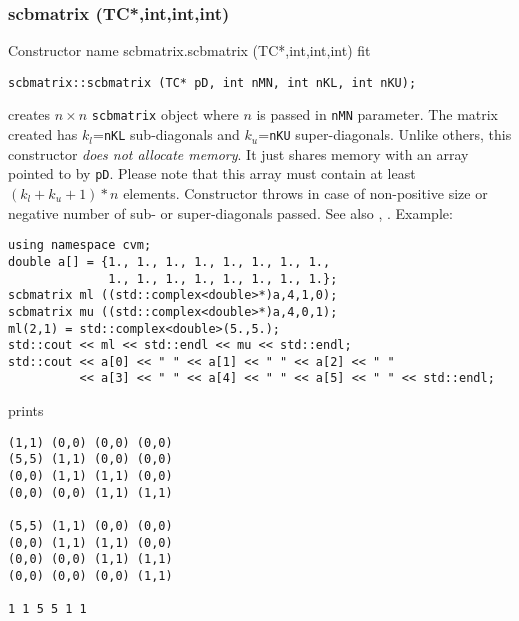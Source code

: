 \subsubsection{scbmatrix (TC*,int,int,int)}
Constructor%
\pdfdest name {scbmatrix.scbmatrix (TC*,int,int,int)} fit
\begin{verbatim}
scbmatrix::scbmatrix (TC* pD, int nMN, int nKL, int nKU);
\end{verbatim}
creates  $n\times n$ \verb"scbmatrix" object where $n$ is passed in
\verb"nMN" parameter. The matrix created has $k_l$=\verb"nKL" 
sub-diagonals and $k_u$=\verb"nKU" super-diagonals.
Unlike others, this constructor \textit{does not allocate  memory}.
It just shares  memory with an array pointed to by \verb"pD".
Please note that this array must contain at least $(k_l + k_u + 1)*n$ elements.
Constructor throws  
in case of non-positive size or negative number of sub- or super-diagonals 
passed.
See also ,
.
Example:
\begin{Verbatim}
using namespace cvm;
double a[] = {1., 1., 1., 1., 1., 1., 1., 1., 
              1., 1., 1., 1., 1., 1., 1., 1.};
scbmatrix ml ((std::complex<double>*)a,4,1,0);
scbmatrix mu ((std::complex<double>*)a,4,0,1);
ml(2,1) = std::complex<double>(5.,5.);
std::cout << ml << std::endl << mu << std::endl;
std::cout << a[0] << " " << a[1] << " " << a[2] << " "
          << a[3] << " " << a[4] << " " << a[5] << " " << std::endl;
\end{Verbatim}
prints
\begin{Verbatim}
(1,1) (0,0) (0,0) (0,0)
(5,5) (1,1) (0,0) (0,0)
(0,0) (1,1) (1,1) (0,0)
(0,0) (0,0) (1,1) (1,1)

(5,5) (1,1) (0,0) (0,0)
(0,0) (1,1) (1,1) (0,0)
(0,0) (0,0) (1,1) (1,1)
(0,0) (0,0) (0,0) (1,1)

1 1 5 5 1 1
\end{Verbatim}
\newpage


